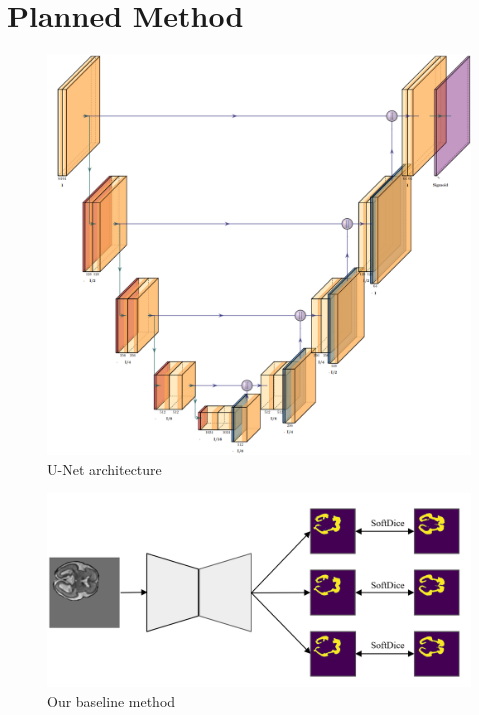 \documentclass[12pt]{extarticle}
\begin{document}
\section{Planned Method}
\begin{figure}[ht!]
\centering
\includegraphics[scale=0.28]{fig2.png}
\caption{U-Net architecture\cite{iqbal_2018}}
\label{pre_results}
\end{figure}
\begin{figure}[ht!]
\centering
\includegraphics[scale=0.25]{fig3.png}
\caption{Our baseline method}
\label{proposed_mothod}
\end{figure}
\end{document}
